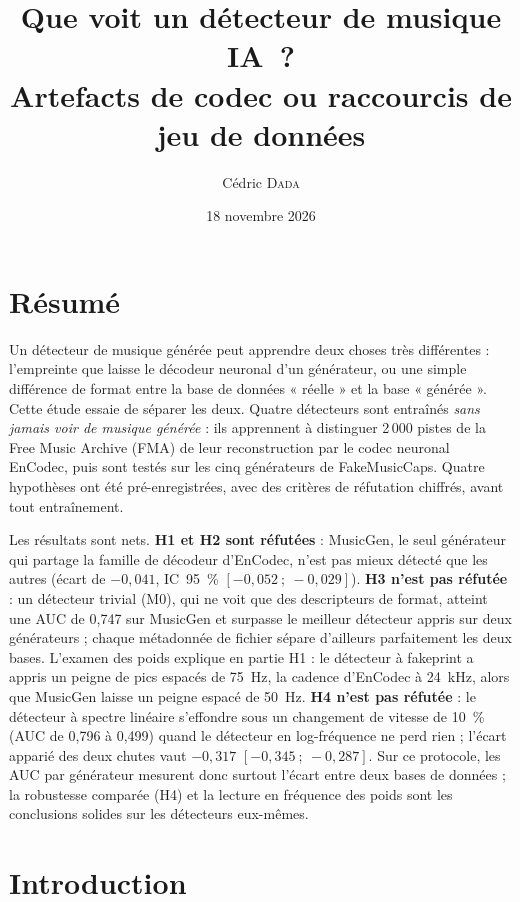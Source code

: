 \documentclass[a4paper, 11pt]{article}
\title{Que voit un détecteur de musique IA~?\\[0.4em]
{\Large Artefacts de codec ou raccourcis de jeu de données}}
\author{Cédric \textsc{Dada}}
\date{18 novembre 2026}
\newcommand{\Mzero}{M0}
\begin{document}
\maketitle

\section*{Résumé}

Un détecteur de musique générée peut apprendre deux choses très différentes : l'empreinte que laisse
le décodeur neuronal d'un générateur, ou une simple différence de format entre la base de données
« réelle » et la base « générée ». Cette étude essaie de séparer les deux. Quatre détecteurs sont
entraînés \emph{sans jamais voir de musique générée} : ils apprennent à distinguer 2\,000 pistes de la
Free Music Archive (FMA) de leur reconstruction par le codec neuronal EnCodec, puis sont testés sur les
cinq générateurs de FakeMusicCaps. Quatre hypothèses ont été pré-enregistrées, avec des critères de
réfutation chiffrés, avant tout entraînement.

Les résultats sont nets. \textbf{H1 et H2 sont réfutées} : MusicGen, le seul générateur qui partage la
famille de décodeur d'EnCodec, n'est pas mieux détecté que les autres (écart de $-0{,}041$, IC~95~\%
$[-0{,}052~;~-0{,}029]$). \textbf{H3 n'est pas réfutée} : un détecteur trivial (\Mzero), qui ne voit que
des descripteurs de format, atteint une AUC de 0,747 sur MusicGen et surpasse le meilleur détecteur
appris sur deux générateurs ; chaque métadonnée de fichier sépare d'ailleurs parfaitement les deux bases.
L'examen des poids explique en partie H1 : le détecteur à fakeprint a appris un peigne de pics espacés de
75~Hz, la cadence d'EnCodec à 24~kHz, alors que MusicGen laisse un peigne espacé de 50~Hz.
\textbf{H4 n'est pas réfutée} : le détecteur à spectre linéaire s'effondre sous un changement de vitesse
de 10~\% (AUC de 0,796 à 0,499) quand le détecteur en log-fréquence ne perd rien ; l'écart apparié des
deux chutes vaut $-0{,}317$ $[-0{,}345~;~-0{,}287]$. Sur ce protocole, les AUC par générateur mesurent
donc surtout l'écart entre deux bases de données ; la robustesse comparée (H4) et la lecture en fréquence
des poids sont les conclusions solides sur les détecteurs eux-mêmes.

\vspace{1em}
\tableofcontents
\newpage

\section{Introduction}
\end{document}
